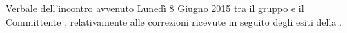 Verbale dell'incontro avvenuto Lunedì 8 Giugno 2015 tra il gruppo \gruppo e il Committente \committenteAlt, relativamente alle correzioni ricevute in seguito degli esiti della \RQ.
